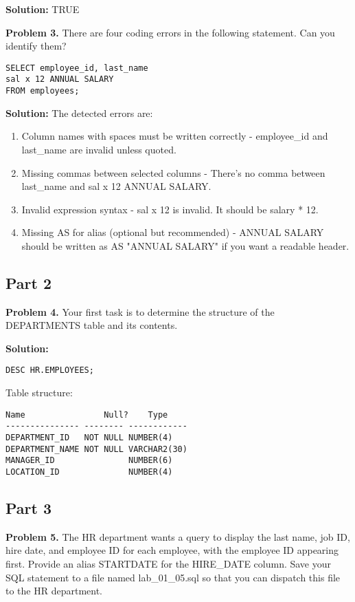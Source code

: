 \documentclass[12pt,a4paper]{article}
\begin{document}
\textbf{Solution:} TRUE

\textbf{Problem 3.} There are four coding errors in the following statement. Can you identify them?
\begin{lstlisting}[style=sqlstyle]
SELECT employee_id, last_name
sal x 12 ANNUAL SALARY
FROM employees;
\end{lstlisting}

\textbf{Solution:}
The detected errors are:
\begin{enumerate}
    \item Column names with spaces must be written correctly - employee\_id and last\_name are invalid unless quoted.
    \item Missing commas between selected columns - There's no comma between last\_name and sal x 12 ANNUAL SALARY.
    \item Invalid expression syntax - sal x 12 is invalid. It should be salary * 12.
    \item Missing AS for alias (optional but recommended) - ANNUAL SALARY should be written as AS "ANNUAL SALARY" if you want a readable header.
\end{enumerate}

\subsection{Part 2}

\textbf{Problem 4.} Your first task is to determine the structure of the DEPARTMENTS table and its contents.

\textbf{Solution:}
\begin{lstlisting}[style=sqlstyle]
DESC HR.EMPLOYEES;
\end{lstlisting}

Table structure:
\begin{verbatim}
Name                Null?    Type
--------------- -------- ------------
DEPARTMENT_ID   NOT NULL NUMBER(4)
DEPARTMENT_NAME NOT NULL VARCHAR2(30)
MANAGER_ID               NUMBER(6)
LOCATION_ID              NUMBER(4)
\end{verbatim}

\subsection{Part 3}

\textbf{Problem 5.} The HR department wants a query to display the last name, job ID, hire date, and employee ID for each employee, with the employee ID appearing first. Provide an alias STARTDATE for the HIRE\_DATE column. Save your SQL statement to a file named lab\_01\_05.sql so that you can dispatch this file to the HR department.
\end{document}
